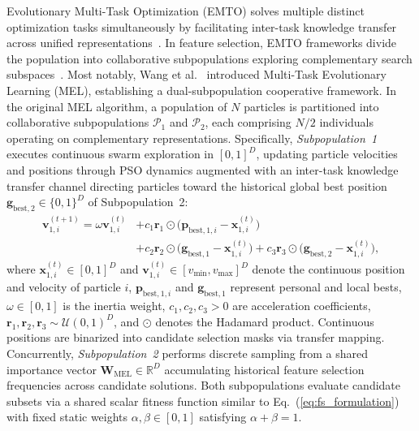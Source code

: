 Evolutionary Multi-Task Optimization (EMTO) solves multiple distinct optimization tasks simultaneously by facilitating inter-task knowledge transfer across unified representations~\cite{zhang2021mtl}. In feature selection, EMTO frameworks divide the population into collaborative subpopulations exploring complementary search subspaces~\cite{zhang2021minion,chen2020emfs,chen2021emfs,he2022,liu2022}. Most notably, Wang et al.~\cite{mel2024} introduced Multi-Task Evolutionary Learning (MEL), establishing a dual-subpopulation cooperative framework. In the original MEL algorithm, a population of $N$ particles is partitioned into collaborative subpopulations $\mathcal{P}_1$ and $\mathcal{P}_2$, each comprising $N/2$ individuals operating on complementary representations. Specifically, \textit{Subpopulation~1} executes continuous swarm exploration in $[0, 1]^D$, updating particle velocities and positions through PSO dynamics augmented with an inter-task knowledge transfer channel directing particles toward the historical global best position $\mathbf{g}_{\mathrm{best},2} \in \{0, 1\}^D$ of Subpopulation~2:
\begin{equation}
\begin{aligned}
\mathbf{v}_{1,i}^{(t+1)} = \omega \mathbf{v}_{1,i}^{(t)} &+ c_1 \mathbf{r}_1 \odot \bigl(\mathbf{p}_{\mathrm{best},1,i} - \mathbf{x}_{1,i}^{(t)}\bigr) \\
&+ c_2 \mathbf{r}_2 \odot \bigl(\mathbf{g}_{\mathrm{best},1} - \mathbf{x}_{1,i}^{(t)}\bigr) + c_3 \mathbf{r}_3 \odot \bigl(\mathbf{g}_{\mathrm{best},2} - \mathbf{x}_{1,i}^{(t)}\bigr),
\end{aligned}
\label{eq:mel_sub1}
\end{equation}
where $\mathbf{x}_{1,i}^{(t)} \in [0, 1]^D$ and $\mathbf{v}_{1,i}^{(t)} \in [v_{\min}, v_{\max}]^D$ denote the continuous position and velocity of particle $i$, $\mathbf{p}_{\mathrm{best},1,i}$ and $\mathbf{g}_{\mathrm{best},1}$ represent personal and local bests, $\omega \in [0, 1]$ is the inertia weight, $c_1, c_2, c_3 > 0$ are acceleration coefficients, $\mathbf{r}_1, \mathbf{r}_2, \mathbf{r}_3 \sim \mathcal{U}(0, 1)^D$, and $\odot$ denotes the Hadamard product. Continuous positions are binarized into candidate selection masks via transfer mapping. Concurrently, \textit{Subpopulation~2} performs discrete sampling from a shared importance vector $\mathbf{W}_{\mathrm{MEL}} \in \mathbb{R}^D$ accumulating historical feature selection frequencies across candidate solutions. Both subpopulations evaluate candidate subsets via a shared scalar fitness function similar to Eq.~(\ref{eq:fs_formulation}) with fixed static weights $\alpha, \beta \in [0, 1]$ satisfying $\alpha + \beta = 1$.

